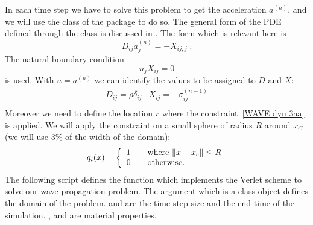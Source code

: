 In each time step we have to solve this problem to get the acceleration $a^{(n)}$,
and we will use the \LinearPDE class of the \linearPDEs package to do so.
The general form of the PDE defined through the \LinearPDE class is discussed
in . The form which is relevant here is
\begin{equation}\label{WAVE dyn 100}
D_{ij} a^{(n)}_{j} = - X_{ij,j}\; .
\end{equation}
The natural boundary condition
\begin{equation}\label{WAVE dyn 101}
n_{j}X_{ij} =0 
\end{equation}
is used. 
With $u=a^{(n)}$ we can identify the values to be assigned to $D$ and $X$:
\begin{equation}\label{WAVE dyn 6}
\begin{array}{ll}
D_{ij}=\rho \delta_{ij}&
X_{ij}=-\sigma^{(n-1)}_{ij}\\
\end{array}
\end{equation}
Moreover we need to define the location $r$ where the constraint~\ref{WAVE dyn 3aa} is applied.
We will apply the constraint on a small sphere of radius $R$ around
$x_C$ (we will use 3\% of the width of the domain):  
\begin{equation}\label{WAVE dyn 6 1}
q_{i}(x) = 
\left\{
\begin{array}{l l}
    1 & \quad \text{where $\|x-x_c\|\le R$}\\
    0 & \quad \text{otherwise.}
\end{array}
\right.
\end{equation}
The following script defines the function  which
implements the Verlet scheme to solve our wave propagation problem.
The argument  which is a \Domain class object defines the domain
of the problem.
 and  are the time step size and the end time of the simulation.
,  and  are material properties.
